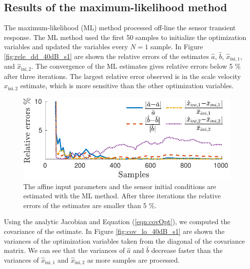 \subsection{Results of the maximum-likelihood method}
The maximum-likelihood (ML) method processed off-line the sensor transient response.
The ML method used the first 50 samples to initialize the optimization variables and updated the variables every $N = 1$ sample.
In Figure \ref{fig:rele_dd_40dB_s1} are shown the relative errors of the estimates $\widehat{a}$, $\widehat{b}$, $\widehat{x}_{\mathrm{ini,1}}$, and $\widehat{x}_{\mathrm{ini,2}}$.
The convergence of the ML estimates gives relative errors below 5 \% after three iterations.
The largest relative error observed is in the scale velocity $\widehat{x}_{\mathrm{ini,2}}$ estimate, which is more sensitive than the other optimization variables.

\begin{figure}[!htbp]
\centering
\includegraphics[width=1\columnwidth]{./ChapterRampInput/fig/Fig_7.pdf} 
\caption{ \label{fig:rele_lo_40dB_s10} The affine input parameters and the sensor initial conditions are estimated with the ML method. After three iterations the relative errors of the estimates are smaller than 5 \%.  }
\end{figure}

Using the analytic Jacobian and Equation (\ref{eqn:covOpt}), we computed the covariance of the estimate.
In Figure \ref{fig:cov_lo_40dB_s1} are shown the variances of the optimization variables taken from the diagonal of the covariance matrix. 
We can see that the variances of $\widehat{a}$ and $\widehat{b}$ decrease faster than the variances of $\widehat{x}_{\mathrm{ini,1}}$ and $\widehat{x}_{\mathrm{ini,2}}$ as more samples are processed.


